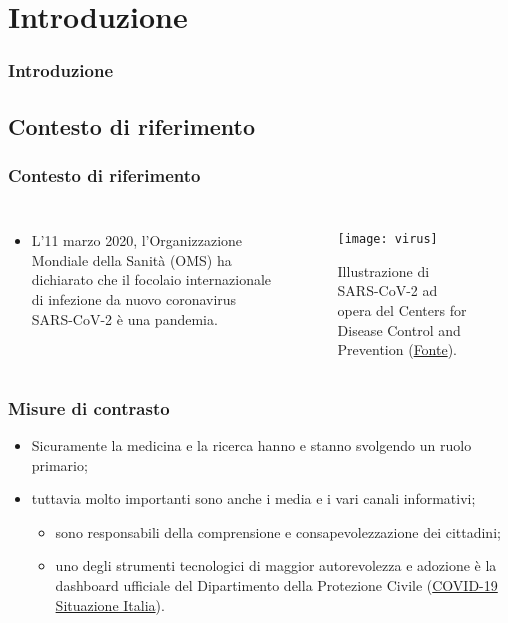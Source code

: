 \documentclass[../../main.tex]{subfiles}
\begin{document}
\section{Introduzione}

\begin{frame}
    \frametitle{Introduzione}
\end{frame}

\subsection{Contesto di riferimento}
\begin{frame}
    \frametitle{Contesto di riferimento}
    
    \begin{columns}
        
        \begin{itemize}
            \item L'11 marzo 2020, l'Organizzazione Mondiale della Sanità (OMS) ha dichiarato che il focolaio internazionale di infezione da nuovo coronavirus SARS-CoV-2 è una pandemia.
        \end{itemize}

        \begin{figure}
            \texttt{[image: virus]}
            \caption{Illustrazione di SARS-CoV-2 ad opera del Centers for Disease Control and Prevention (\href{https://phil.cdc.gov/Details.aspx?pid=23312}{Fonte}).}
        \end{figure}
        
    \end{columns}

\end{frame}

\begin{frame}
    \frametitle{Misure di contrasto}

    \begin{itemize}
        \item<1-> Sicuramente la medicina e la ricerca hanno e stanno svolgendo
        un ruolo primario;
        \item<2-> tuttavia molto importanti sono anche i media e i vari canali informativi;
        \begin{itemize}
            \item sono responsabili della comprensione e \alert{consapevolezzazione dei cittadini};
            \item uno degli strumenti tecnologici di maggior autorevolezza e adozione è la dashboard ufficiale del Dipartimento della Protezione Civile (\href{https://opendatadpc.maps.arcgis.com/apps/opsdashboard/index.html\#/b0c68bce2cce478eaac82fe38d4138b1}{COVID-19 Situazione Italia}).
        \end{itemize}              

    \end{itemize}

\end{frame}
\end{document}
